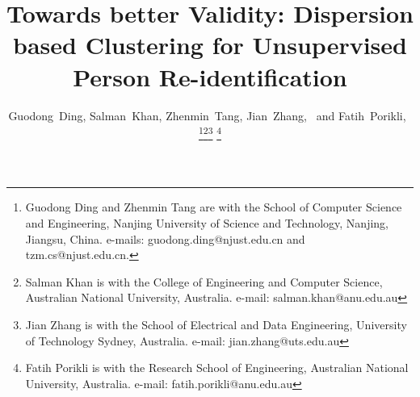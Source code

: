 \documentclass[journal]{IEEEtran}
\begin{document}
\title{Towards better Validity: Dispersion based Clustering for Unsupervised Person Re-identification}

\author{Guodong~Ding,
        Salman~Khan,  Zhenmin~Tang, Jian~Zhang,~ and
        Fatih~Porikli,~
\thanks{Guodong Ding and Zhenmin Tang are with the School of Computer Science and Engineering, Nanjing University of Science and Technology, Nanjing, Jiangsu, China. e-mails: guodong.ding@njust.edu.cn and tzm.cs@njust.edu.cn.}\thanks{Salman Khan is with the College of Engineering and Computer Science, Australian National University, Australia. e-mail: salman.khan@anu.edu.au}\thanks{Jian Zhang is with the School of Electrical and Data Engineering, University of Technology Sydney, Australia. e-mail: jian.zhang@uts.edu.au}
\thanks{Fatih Porikli is with the Research School of Engineering, Australian National University, Australia. e-mail: fatih.porikli@anu.edu.au}}



\maketitle
\end{document}
